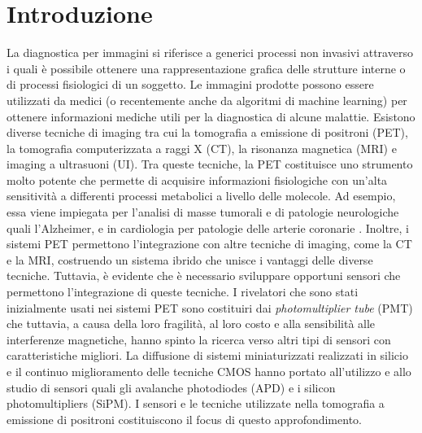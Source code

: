 \chapter*{Introduzione}
La diagnostica per immagini si riferisce a generici processi non invasivi attraverso i quali è possibile ottenere una rappresentazione grafica delle strutture interne o di processi fisiologici di un soggetto. Le immagini prodotte possono essere utilizzati da medici (o recentemente anche da algoritmi di machine learning) per ottenere informazioni mediche utili per la diagnostica di alcune malattie. Esistono diverse tecniche di imaging tra cui la tomografia a emissione di positroni (PET), la tomografia computerizzata a raggi X (CT), la risonanza magnetica (MRI) e imaging a ultrasuoni (UI). Tra queste tecniche, la PET costituisce uno strumento molto potente che permette di acquisire informazioni fisiologiche con un'alta sensitività a differenti processi metabolici a livello delle molecole. Ad esempio, essa viene impiegata per l'analisi di masse tumorali e di patologie neurologiche quali l'Alzheimer, e in cardiologia per patologie delle arterie coronarie \cite{Jiang2019}. Inoltre, i sistemi PET permettono l'integrazione con altre tecniche di imaging, come la CT e la MRI, costruendo un sistema ibrido che unisce i vantaggi delle diverse tecniche. Tuttavia, è evidente che è necessario sviluppare opportuni sensori che permettono l'integrazione di queste tecniche. I rivelatori che sono stati inizialmente usati nei sistemi PET sono costituiri dai \textit{photomultiplier tube} (PMT) che tuttavia, a causa della loro fragilità, al loro costo e alla sensibilità alle interferenze magnetiche, hanno spinto la ricerca verso altri tipi di sensori con caratteristiche migliori. La diffusione di sistemi miniaturizzati realizzati in silicio e il continuo miglioramento delle tecniche CMOS hanno portato all'utilizzo e allo studio di sensori quali gli avalanche photodiodes (APD) e i silicon photomultipliers (SiPM). I sensori e le tecniche utilizzate nella tomografia a emissione di positroni costituiscono il focus di questo approfondimento.